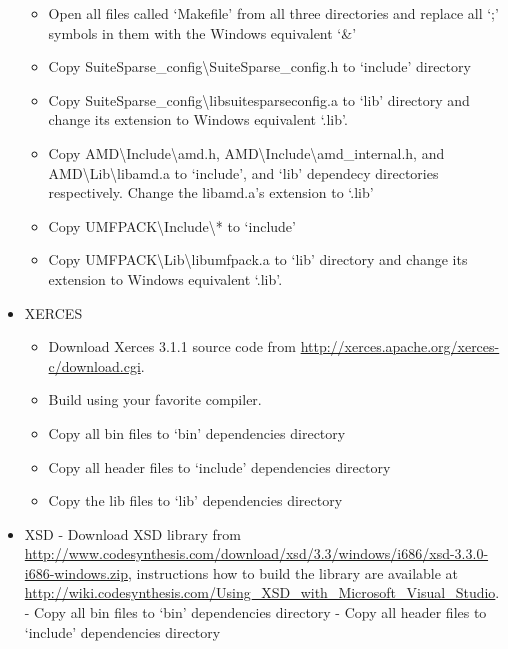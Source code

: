 \documentclass[a4paper,0pt,english]{sphinxmanual}
\begin{document}
\begin{itemize}
\begin{itemize}
\begin{itemize}
\end{itemize}

\item {} 
Open all files called `Makefile' from all three directories and replace all `;' symbols in them with the Windows equivalent `\&'

\item {} 
Copy SuiteSparse\_config\textbackslash{}SuiteSparse\_config.h to `include' directory

\item {} 
Copy SuiteSparse\_config\textbackslash{}libsuitesparseconfig.a to `lib' directory and change its extension to Windows equivalent `.lib'.

\item {} 
Copy AMD\textbackslash{}Include\textbackslash{}amd.h, AMD\textbackslash{}Include\textbackslash{}amd\_internal.h, and AMD\textbackslash{}Lib\textbackslash{}libamd.a to `include', and `lib' dependecy directories respectively. Change the libamd.a's extension to `.lib'

\item {} 
Copy UMFPACK\textbackslash{}Include\textbackslash{}* to `include'

\item {} 
Copy UMFPACK\textbackslash{}Lib\textbackslash{}libumfpack.a to `lib' directory and change its extension to Windows equivalent `.lib'.

\end{itemize}

\item {} 
XERCES
\begin{itemize}
\item {} 
Download Xerces 3.1.1 source code from \href{http://xerces.apache.org/xerces-c/download.cgi}{http://xerces.apache.org/xerces-c/download.cgi}.

\item {} 
Build using your favorite compiler.

\item {} 
Copy all bin files to `bin' dependencies directory

\item {} 
Copy all header files to `include' dependencies directory

\item {} 
Copy the lib files to `lib' dependencies directory

\end{itemize}

\item {} 
XSD
- Download XSD library from \href{http://www.codesynthesis.com/download/xsd/3.3/windows/i686/xsd-3.3.0-i686-windows.zip}{http://www.codesynthesis.com/download/xsd/3.3/windows/i686/xsd-3.3.0-i686-windows.zip}, instructions how to build the library are available at \href{http://wiki.codesynthesis.com/Using\_XSD\_with\_Microsoft\_Visual\_Studio}{http://wiki.codesynthesis.com/Using\_XSD\_with\_Microsoft\_Visual\_Studio}.
- Copy all bin files to `bin' dependencies directory
- Copy all header files to `include' dependencies directory


\end{itemize}
\end{document}

